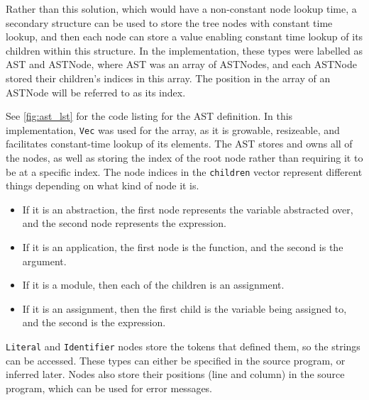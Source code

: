 Rather than this solution, which would have a non-constant node lookup time, a secondary structure can be used to store the tree nodes with constant time lookup, and then each node can store a value enabling constant time lookup of its children within this structure. In the implementation, these types were labelled as \ac{AST} and ASTNode, where \ac{AST} was an array of ASTNodes, and each ASTNode stored their children's indices in this array. The position in the array of an ASTNode will be referred to as its index.

See \ref{fig:ast_lst} for the code listing for the \ac{AST} definition. In this implementation, \verb|Vec| was used for the array, as it is growable, resizeable, and facilitates constant-time lookup of its elements. The \ac{AST} stores and owns all of the nodes, as well as storing the index of the root node rather than requiring it to be at a specific index. The node indices in the \verb|children| vector represent different things depending on what kind of node it is.
\begin{itemize}
    \item If it is an abstraction, the first node represents the variable abstracted over, and the second node represents the expression.
    \item If it is an application, the first node is the function, and the second is the argument.
    \item If it is a module, then each of the children is an assignment.
    \item If it is an assignment, then the first child is the variable being assigned to, and the second is the expression.
\end{itemize}

\noindent \verb|Literal| and \verb|Identifier| nodes store the tokens that defined them, so the strings can be accessed. These types can either be specified in the source program, or inferred later. Nodes also store their positions (line and column) in the source program, which can be used for error messages. 

